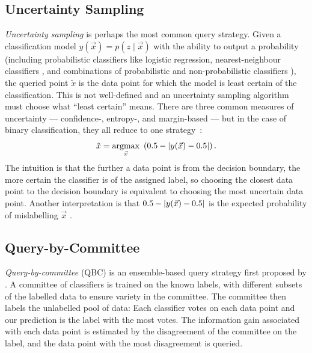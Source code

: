     \subsection{Uncertainty Sampling}
    \label{sec:uncertainty-sampling}

        \emph{Uncertainty sampling} \citep{lewis94} is perhaps the most common
        query strategy. Given a classification model $y(\vec x) = p(z \mid
        \vec{x})$ with the ability to output a probability (including
        probabilistic classifiers like logistic regression, nearest-neighbour
        classifiers \citep{lewis94}, and combinations of probabilistic and
        non-probabilistic classifiers \citep{lewis94b}), the queried point
        $\tilde x$ is the data point for which the model is least certain of the
        classification. This is not well-defined and an uncertainty sampling
        algorithm must choose what ``least certain'' means. There are three
        common measures of uncertainty --- confidence-, entropy-, and
        margin-based --- but in the case of binary classification, they all
        reduce to one strategy~\citep{settles09}:
        \[
            \tilde x = \underset{\vec x}{\mbox{argmax}}\ \left(0.5 - \abs{y(\vec x) - 0.5}\right).
        \]
        The intuition is that the further a data point is from the decision
        boundary, the more certain the classifier is of the assigned label, so
        choosing the closest data point to the decision boundary is equivalent
        to choosing the most uncertain data point. Another interpretation is
        that $0.5 - |y(\vec x) - 0.5|$ is the expected probability of
        mislabelling $\vec x$ \citep{settles09}.



    \subsection{Query-by-Committee}
    \label{sec:qbc}

        \emph{Query-by-committee} (QBC) is an ensemble-based query strategy
        first proposed by \citet{seung92}. A committee of classifiers is trained
        on the known labels, with different subsets of the labelled data to
        ensure variety in the committee. The committee then labels the
        unlabelled pool of data: Each classifier votes on each data point and
        our prediction is the label with the most votes. The information gain
        associated with each data point is estimated by the disagreement of the
        committee on the label, and the data point with the most disagreement is
        queried.

